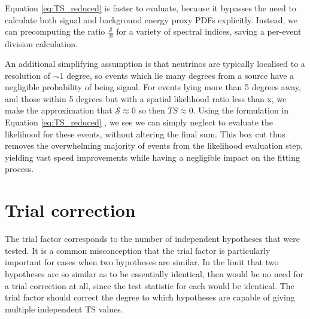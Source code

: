 Equation \ref{eq:TS_reduced}  is faster to evaluate, because it bypasses the need to calculate both signal and background energy proxy PDFs explicitly. Instead, we can precomputing the ratio $\frac{\mathcal{S}}{\mathcal{B}}$ for a variety of spectral indices, saving a per-event division calculation.

An additional simplifying assumption is that neutrinos are typically localised to a resolution of $\sim$1 degree, so events which lie many degrees from a source have a negligible probability of being signal. For events lying more than 5 degrees away, and those within 5 degrees but with a spatial likelihood ratio less than x, we make the approximation that $\mathcal{S} \approx 0$ so then $TS \approx 0$. Using the formulation in Equation \ref{eq:TS_reduced} , we see we can simply neglect to evaluate the likelihood for these events, without altering the final sum. This box cut thus removes the overwhelming majority of events from the likelihood evaluation step, yielding vast speed improvements while having a negligible impact on the fitting process.
\section{Trial correction}


The trial factor corresponds to the number of independent hypotheses that were tested. It is a common misconception that the trial factor is particularly important for cases when two hypotheses are similar. In the limit that two hypotheses are so similar as to be essentially identical, then would be no need for a trial correction at all, since the test statistic for each would be identical. The trial factor should correct the degree to which hypotheses are capable of giving multiple independent TS values.
